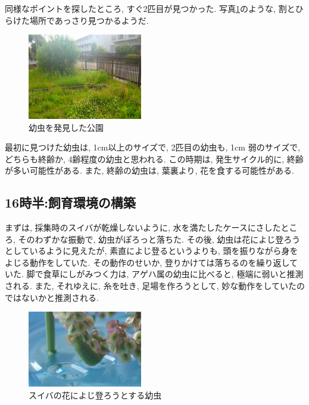 \documentclass{jsarticle}
\begin{document}
同様なポイントを探したところ, すぐ2匹目が見つかった. 
写真\ref{pic-field}のような, 割とひらけた場所であっさり見つかるようだ. 
\begin{figure}
  \begin{center}
    \includegraphics[width=5cm]{photo/park.JPG}
  \end{center}
  \caption{幼虫を発見した公園}
  \label{pic-field}
\end{figure}
最初に見つけた幼虫は, 1cm以上のサイズで, 2匹目の幼虫も, 1cm 弱のサイズで, どちらも終齢か, 4齢程度の幼虫と思われる. 
この時期は, 発生サイクル的に, 終齢が多い可能性がある. また, 終齢の幼虫は, 葉裏より, 花を食する可能性がある. 

\subsection{16時半:飼育環境の構築}
まずは, 採集時のスイバが乾燥しないように, 水を満たしたケースにさしたところ, そのわずかな振動で, 幼虫がぽろっと落ちた. 
その後, 幼虫は花によじ登ろうとしているように見えたが, 素直によじ登るというよりも, 頭を振りながら身をよじる動作をしていた. その動作のせいか, 登りかけては落ちるのを繰り返していた. 
脚で食草にしがみつく力は, アゲハ属の幼虫に比べると, 極端に弱いと推測される. 
また, それゆえに, 糸を吐き, 足場を作ろうとして, 妙な動作をしていたのではないかと推測される. 
\begin{figure}[htbp]
  \begin{center}
    \includegraphics[width=5cm]{photo/try_to_climb.JPG}
    \caption{スイバの花によじ登ろうとする幼虫}
    \label{pic-try-to-climb}
  \end{center}
\end{figure}
\end{document}
